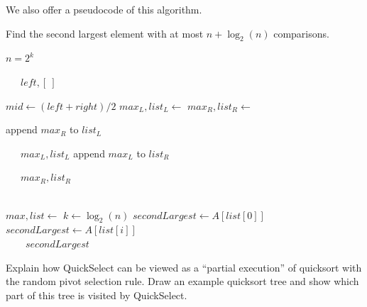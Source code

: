 We also offer a pseudocode of this algorithm.
\begin{algorithm}
    \caption{Find the second largest element with at most $n + \log_2(n)$ comparisons.}
    \begin{algorithmic}
        \Ensure $n = 2^k$
            
                \ \ \ \Return $left, [\ ]$
            \EndIf
            
            \State $mid \gets (left + right) / 2$
            \State $max_L, list_L \gets$ 
            \State $max_R, list_R \gets$ 
            
                \State append $max_R$ to $list_L$
                
                \ \ \ \Return $max_L, list_L$
            \Else
                \State append $max_L$ to $list_R$
                
                \ \ \ \Return $max_R, list_R$
            \EndIf
        \EndFunction
        
        \\
            \State $max, list \gets$ 
            \State $k \gets \log_2(n)$
            \State $secondLargest \gets A[list[0]]$
                    \State $secondLargest \gets A[list[i]]$
                \EndIf
            \EndFor
            \\\ \ \ \ \Return $secondLargest$
        \EndFunction
    \end{algorithmic}
\end{algorithm}

\newpage

\begin{thm}{}{}
    Explain how QuickSelect can be viewed as a “partial execution” of quicksort with the random pivot selection rule. Draw an example quicksort tree and show which part of this tree is visited by QuickSelect.
\end{thm}

